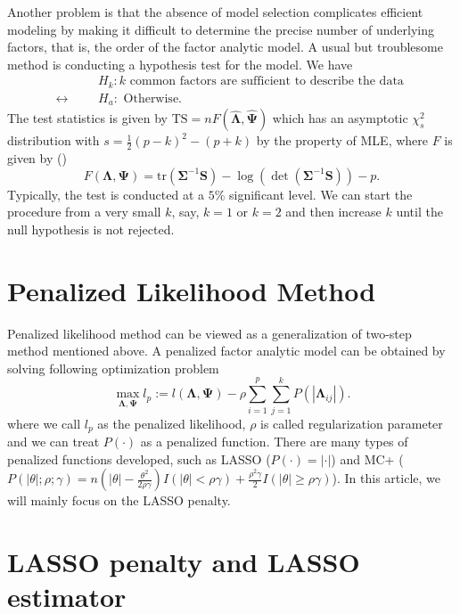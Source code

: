 \documentclass[
  a4paper,
  oneside,
  openany,
  12pt,
  onecolumn]{book}
\theoremstyle{plain}
\theoremstyle{remark}
\begin{document}
Another problem is that the absence of model selection complicates
efficient modeling by making it difficult to determine the precise
number of underlying factors, that is, the order of the factor analytic
model. A usual but troublesome method is conducting a hypothesis test
for the model\citep{mardiaMultivariateAnalysis1979}. We have
\begin{align*}
  &&&H_k: k \text{ common factors are sufficient to describe the data } \\
  \longleftrightarrow &&&H_a: \text{ Otherwise}.
\end{align*} The test statistics is given by
\(\text{TS}=nF(\hat{\boldsymbol{\Lambda}},\hat{\boldsymbol{\Psi}})\)
which has an asymptotic \(\chi^2_s\) distribution with
\(s=\frac{1}{2}(p-k)^2-(p+k)\) by the property of MLE, where \(F\) is
given by (\citet{mardiaMultivariateAnalysis1979}) \[
F(\boldsymbol{\Lambda},\boldsymbol{\Psi})=\text{tr}(\boldsymbol{\Sigma}^{-1}\boldsymbol{S})-\log(\det(\boldsymbol{\Sigma}^{-1}\boldsymbol{S}))-p.
\] Typically, the test is conducted at a \(5\%\) significant level. We
can start the procedure from a very small \(k\), say, \(k=1\) or \(k=2\)
and then increase \(k\) until the null hypothesis is not rejected.

\section{Penalized Likelihood Method}\label{penalized-likelihood-method}

Penalized likelihood method can be viewed as a generalization of
two-step method mentioned
above\citep{hiroseSparseEstimationNonconcave2015}. A penalized factor
analytic model can be obtained by solving following optimization problem
\[
 \max_{\boldsymbol{\Lambda},\boldsymbol{\Psi}}l_p := l(\boldsymbol{\Lambda},\boldsymbol{\Psi})-\rho\sum^p_{i=1}\sum^k_{j=1}P(|\boldsymbol{\Lambda}_{ij}|).
\] where we call \(l_p\) as the penalized likelihood, \(\rho\) is called
regularization parameter and we can treat \(P(\cdot)\) as a penalized
function. There are many types of penalized functions developed, such as
LASSO (\(P(\cdot)=|\cdot|\)) and MC+
(\(P(|\theta|;\rho;\gamma)=n(|\theta|-\frac{\theta^2}{2\rho\gamma})I(|\theta|<\rho\gamma)+\frac{\rho^2\gamma}{2}I(|\theta|\geq\rho\gamma)\))\citep{hiroseSparseEstimationNonconcave2015}.
In this article, we will mainly focus on the LASSO penalty.

\section{LASSO penalty and LASSO
estimator}\label{lasso-penalty-and-lasso-estimator}
\end{document}
